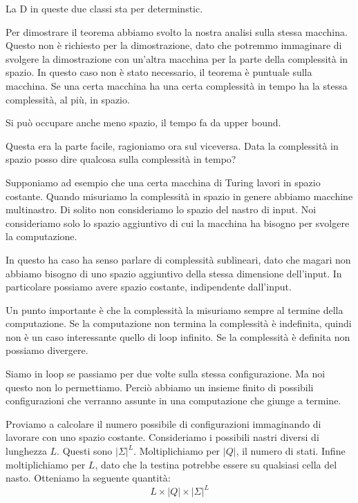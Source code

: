 La D in queste due classi sta per determinstic.

Per dimostrare il teorema abbiamo svolto la nostra analisi sulla stessa macchina. Questo non è
richiesto per la dimostrazione, dato che potremmo immaginare di svolgere la dimostrazione con
un'altra macchina per la parte della complessità in spazio. In questo caso non è stato necessario,
il teorema è puntuale sulla macchina. Se una certa macchina ha una certa complessità in tempo ha la
stessa complessità, al più, in spazio.

Si può occupare anche meno spazio, il tempo fa da upper bound.

Questa era la parte facile, ragioniamo ora sul viceversa. Data la complessità in spazio posso dire
qualcosa sulla complessità in tempo?

Supponiamo ad esempio che una certa macchina di Turing lavori in spazio costante. Quando misuriamo
la complessità in spazio in genere abbiamo macchine multinastro. Di solito non consideriamo lo
spazio del nastro di input. Noi consideriamo solo lo spazio aggiuntivo di cui la macchina ha bisogno
per svolgere la computazione.

In questo ha caso ha senso parlare di complessità sublineari, dato che magari non abbiamo bisogno
di uno spazio aggiuntivo della stessa dimensione dell'input. In particolare possiamo avere spazio
costante, indipendente dall'input.

Un punto importante è che la complessità la misuriamo sempre al termine della computazione. Se la
computazione non termina la complessità è indefinita, quindi non è un caso interessante quello di
loop infinito. Se la complessità è definita non possiamo divergere.

Siamo in loop se passiamo per due volte sulla stessa configurazione. Ma noi questo non lo
permettiamo. Perciò abbiamo un insieme finito di possibili configurazioni che verranno assunte in
una computazione che giunge a termine.

Proviamo a calcolare il numero possibile di configurazioni immaginando di lavorare con uno spazio
costante. Consideriamo i possibili nastri diversi di lunghezza $L$. Questi sono $|\Sigma|^{L}$.
Moltiplichiamo per $|Q|$, il numero di stati. Infine moltiplichiamo per $L$, dato che la testina
potrebbe essere su qualsiasi cella del nasto. Otteniamo la seguente quantità:
\begin{equation*}
    L \times |Q| \times |\Sigma|^{L}
\end{equation*}

